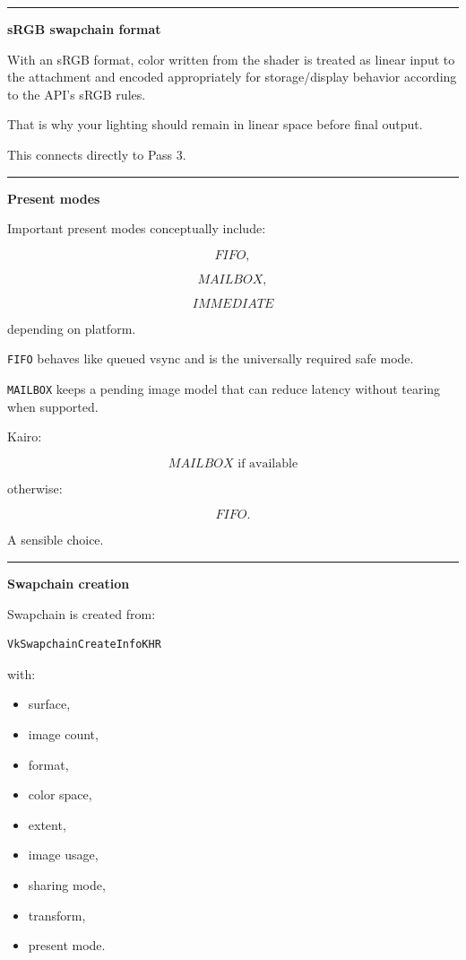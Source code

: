 \begin{center}\rule{0.5\linewidth}{0.5pt}\end{center}

\textbf{sRGB swapchain format}

With an sRGB format, color written from the shader is treated as linear input to the attachment and encoded appropriately for storage/display behavior according to the API's sRGB rules.

That is why your lighting should remain in linear space before final output.

This connects directly to Pass 3.

\begin{center}\rule{0.5\linewidth}{0.5pt}\end{center}

\textbf{Present modes}

Important present modes conceptually include:

\[
FIFO,
\]

\[
MAILBOX,
\]

\[
IMMEDIATE
\]

depending on platform.

\texttt{FIFO} behaves like queued vsync and is the universally required safe mode.

\texttt{MAILBOX} keeps a pending image model that can reduce latency without tearing when supported.

Kairo:

\[
\boxed{
MAILBOX\text{ if available}
}
\]

otherwise:

\[
\boxed{
FIFO.
}
\]

A sensible choice.

\begin{center}\rule{0.5\linewidth}{0.5pt}\end{center}

\textbf{Swapchain creation}

Swapchain is created from:

\begin{verbatim}
VkSwapchainCreateInfoKHR
\end{verbatim}

with:

\begin{itemize}
\tightlist
\item
  surface,
\item
  image count,
\item
  format,
\item
  color space,
\item
  extent,
\item
  image usage,
\item
  sharing mode,
\item
  transform,
\item
  present mode.
\end{itemize}

